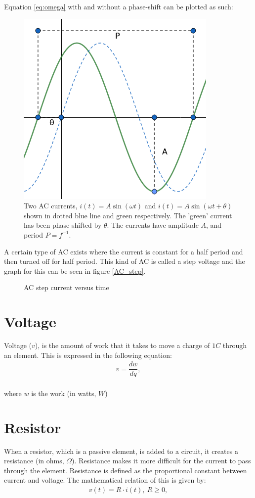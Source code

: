 Equation \eqref{eq:omega} with and without a phase-shift can be plotted as such:
\begin{figure}[H]
	\centering
	\includegraphics[scale=0.7]{fig/img/AC.png}
	\caption{Two AC currents, $i(t)=A\sin(\omega t)$ and $i(t)=A\sin(\omega t+\theta)$ shown in dotted blue line and green respectively. The 'green' current has been phase shifted by $\theta$. The currents have amplitude $A$, and period $P=f^{-1}$.}
\end{figure}
\noindent A certain type of AC exists where the current is constant for a half period and then turned off for half period. This kind of AC is called a step voltage and the graph for this can be seen in figure \ref{AC_step}.
\begin{figure}[H] 

\caption{AC step current versus time}
\label{fig:AC_step}
\end{figure}
\section{Voltage}
Voltage ($v$), is the amount of work that it takes to move a charge of  $1 C$ through an element. This is expressed in the following equation\cite[p. 8]{bcircuit}:
\begin{align*}
	v=\dfrac{dw}{dq},
\end{align*}
\\
where $w$ is the work (in watts, $W$)
\section{Resistor}
When a resistor, which is a passive element, is added to a circuit, it creates a resistance (in ohms, $\Omega$). Resistance makes it more difficult for the current to pass through the element. Resistance is defined as the proportional constant between current and voltage. The mathematical relation of this is given by: \cite[p.~22]{bcircuit5}
\begin{align} 
\label{Ohm}
v(t)=R\cdot i(t),\ R\geq0,
\end{align}
